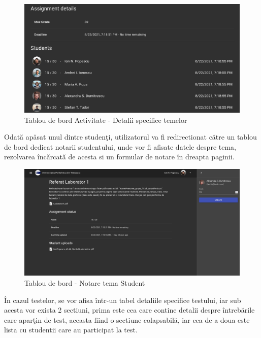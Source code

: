 \documentclass[12pt, a4paper, oneside, romanian]{teza-upb}
\begin{document}
\begin{figure}[H]
\centering
\includegraphics*[width=\columnwidth]{tablou-de-bord-activitate-detalii-specifice-temelor}
\caption{Tablou de bord Activitate - Detalii specifice temelor}
\label{tablou-de-bord-activitate-detalii-specifice-temelor}
\end{figure}

Odată apăsat unul dintre studenţi, utilizatorul va fi redirectionat către un tablou de bord dedicat notarii studentului, unde vor fi afisate datele despre tema, rezolvarea încărcată de acesta si un formular de notare în dreapta paginii.

\begin{figure}[H]
\centering
\includegraphics*[width=\columnwidth]{tablou-de-bord-notare-tema-student}
\caption{Tablou de bord - Notare tema Student}
\label{tablou-de-bord-notare-tema-student}
\end{figure}

În cazul testelor, se vor afisa într-un tabel detaliile specifice testului, iar sub acesta vor exista 2 sectiuni, prima este cea care contine detalii despre întrebările care aparţin de test, aceasta fiind o sectiune colapsabilă, iar cea de-a doua este lista cu studentii care au participat la test.
\end{document}
